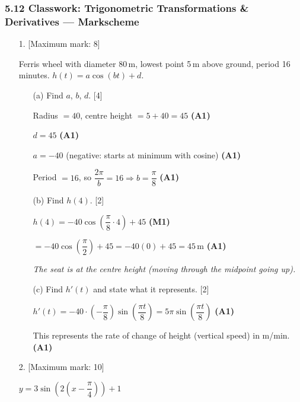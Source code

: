 \documentclass[12pt, twoside]{article}
\begin{document}
\subsubsection*{5.12 Classwork: Trigonometric Transformations \& Derivatives --- Markscheme}

\begin{enumerate}

\item[1.] [Maximum mark: 8]

Ferris wheel with diameter 80\,m, lowest point 5\,m above ground, period 16 minutes.
$h(t) = a\cos(bt) + d$.

\begin{enumerate}
\item[(a)] Find $a$, $b$, $d$. \hfill [4]

Radius $= 40$, centre height $= 5 + 40 = 45$ \hfill \textbf{(A1)}

$d = 45$ \hfill \textbf{(A1)}

$a = -40$ \quad (negative: starts at minimum with cosine) \hfill \textbf{(A1)}

Period $= 16$, so $\dfrac{2\pi}{b} = 16 \Rightarrow b = \dfrac{\pi}{8}$ \hfill \textbf{(A1)}

\item[(b)] Find $h(4)$. \hfill [2]

$h(4) = -40\cos\!\left(\dfrac{\pi}{8} \cdot 4\right) + 45$ \hfill \textbf{(M1)}

$= -40\cos\!\left(\dfrac{\pi}{2}\right) + 45 = -40(0) + 45 = 45$\,m \hfill \textbf{(A1)}

\textit{The seat is at the centre height (moving through the midpoint going up).}

\item[(c)] Find $h'(t)$ and state what it represents. \hfill [2]

$h'(t) = -40 \cdot \left(-\dfrac{\pi}{8}\right)\sin\!\left(\dfrac{\pi t}{8}\right)
= 5\pi\sin\!\left(\dfrac{\pi t}{8}\right)$ \hfill \textbf{(A1)}

This represents the rate of change of height (vertical speed) in m/min. \hfill \textbf{(A1)}
\end{enumerate}
\vspace{0.5cm}

\item[2.] [Maximum mark: 10]

$y = 3\sin\!\left(2\!\left(x - \dfrac{\pi}{4}\right)\right) + 1$


\end{enumerate}
\end{document}
